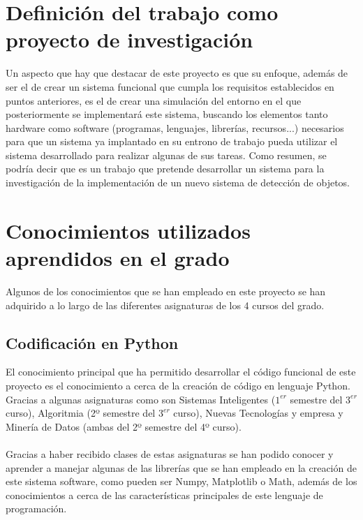 
\section{Definición del trabajo como proyecto de investigación}

Un aspecto que hay que destacar de este proyecto es que su enfoque, además de ser el de crear un sistema funcional que cumpla los requisitos establecidos en puntos anteriores, es el de crear una simulación del entorno en el que posteriormente se implementará este sistema, buscando los elementos tanto hardware como software (programas, lenguajes, librerías, recursos...)  necesarios para que un sistema ya implantado en su entrono de trabajo pueda utilizar el sistema desarrollado para realizar algunas de sus tareas. Como resumen, se podría decir que es un trabajo que pretende desarrollar un sistema para la investigación de la implementación de un nuevo sistema de detección de objetos.\\

\section{Conocimientos utilizados aprendidos en el grado}

Algunos de los conocimientos que se han empleado en este proyecto se han adquirido a lo largo de las diferentes asignaturas de los 4 cursos del grado.\\

\subsection{Codificación en Python}
El conocimiento principal que ha permitido desarrollar el código funcional de este proyecto es el conocimiento a cerca de la creación de código en lenguaje Python. Gracias a algunas asignaturas como son Sistemas Inteligentes ($1^{er}$ semestre del $3^{er}$ curso), Algoritmia (2º semestre del $3^{er}$ curso), Nuevas Tecnologías y empresa y Minería de Datos (ambas del 2º semestre del 4º curso).\\
\\
Gracias a haber recibido clases de estas asignaturas se han podido conocer y aprender a manejar algunas de las librerías que se han empleado en la creación de este sistema software, como pueden ser Numpy, Matplotlib o Math, además de los conocimientos a cerca de las características principales de este lenguaje de programación.\\

